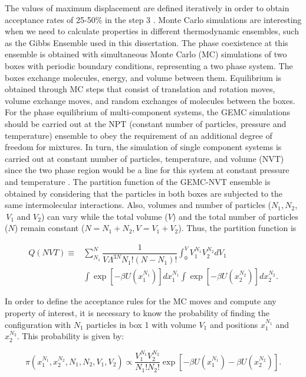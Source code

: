 	The values of maximum displacement are defined iteratively in order to obtain acceptance rates of 25-50\% in the step 3   \cite{Frenkel2013}. Monte Carlo simulations are interesting when we need to calculate properties in different thermodynamic ensembles, such as the Gibbs Ensemble used in this dissertation. The phase coexistence at this ensemble is obtained with simultaneous Monte Carlo (MC) simulations of two boxes with periodic boundary conditions, representing a two phase system. The boxes exchange molecules, energy, and volume between them. Equilibrium is obtained through MC steps that consist of translation and rotation moves, volume exchange moves, and random exchanges of molecules between the boxes. For the phase equilibrium of multi-component systems, the GEMC simulations should be carried out at the NPT (constant number of particles, pressure and temperature) ensemble to obey the requirement of an additional degree of freedom for mixtures. In turn, the simulation of single component systems is carried out at constant number of particles, temperature, and volume (NVT) since the two phase region would be a line for this system at constant pressure and temperature \cite{frenkel}. The partition function of the GEMC-NVT ensemble is obtained by considering that the particles in both boxes are subjected to the same intermolecular interactions. Also, volumes and number of particles ($N_{1}$,$\, N_{2}$,$\, V_{1}$ and $V_{2}$) can vary while the total volume ($V$) and the total number of particles ($N$) remain constant ($N = N_{1} + N_{2}$,$\, V = V_{1} + V_{2}$). Thus, the partition function is
	
	\begin{equation}
	\begin{aligned}
	Q(NVT) {} \equiv & \sum_{N_{1}}^{N} \dfrac{1}{V \Lambda ^{3N} N_{1}!(N-N_{1})!} \int_{0}^{V} V_{1}^{N_{1}} V_{2}^{N_{2}} dV_{1} \\
	& \int  \exp[-\beta U(x_{1}^{N_{1}})] dx_{1}^{N_{1}} \int  \exp[-\beta U(x_{2}^{N_{2}})] dx_{2}^{N_{2}}.
	\end{aligned}
	\label{eqn:gepart}
	\end{equation}
	
	In order to define the acceptance rules for the MC moves and compute any property of interest, it is necessary to know the probability of finding the configuration with $N_{1}$ particles in box 1 with volume $V_{1}$ and positions $x_{1}^{N_{1}}$ and $x_{2}^{N_{2}}$. This probability is given by:
	
	\begin{equation}
	\pi(x_{1}^{N_{1}},x_{2}^{N_{2}},N_{1},N_{2},V_{1},V_{2}) \propto \dfrac{V_{1}^{N_{1}}V_{2}^{N_{2}}}{N_{1}!N_{2}!} \exp[-\beta U(x_{1}^{N_{1}}) -\beta U(x_{2}^{N_{2}})] .
	\label{eqn:geprob}
	\end{equation}
	
